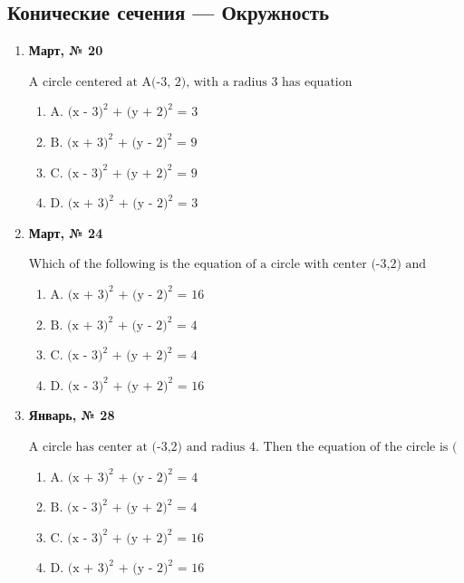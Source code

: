 \subsection*{Конические сечения — Окружность}
\begin{enumerate}
\item \textbf{Март, № 20} \par \smallskip
$\displaystyle \text{A circle centered at A(-3, 2), with a radius 3 has equation}$
\begin{enumerate}
\item $\displaystyle \text{A. (x - 3)}^{2}\text{ + (y + 2)}^{2}\text{ = 3}$
\item $\displaystyle \text{B. (x + 3)}^{2}\text{ + (y - 2)}^{2}\text{ = 9}$
\item $\displaystyle \text{C. (x - 3)}^{2}\text{ + (y + 2)}^{2}\text{ = 9}$
\item $\displaystyle \text{D. (x + 3)}^{2}\text{ + (y - 2)}^{2}\text{ = 3}$
\end{enumerate}
\item \textbf{Март, № 24} \par \smallskip
$\displaystyle \text{Which of the following is the equation of a circle with center (-3,2) and radius 2?}$
\begin{enumerate}
\item $\displaystyle \text{A. (x + 3)}^{2}\text{ + (y - 2)}^{2}\text{ = 16}$
\item $\displaystyle \text{B. (x + 3)}^{2}\text{ + (y - 2)}^{2}\text{ = 4}$
\item $\displaystyle \text{C. (x - 3)}^{2}\text{ + (y + 2)}^{2}\text{ = 4}$
\item $\displaystyle \text{D. (x - 3)}^{2}\text{ + (y + 2)}^{2}\text{ = 16}$
\end{enumerate}
\item \textbf{Январь, № 28} \par \smallskip
$\displaystyle \text{A circle has center at (-3,2) and radius 4. Then the equation of the circle is ( ).}$
\begin{enumerate}
\item $\displaystyle \text{A. (x + 3)}^{2}\text{ + (y - 2)}^{2}\text{ = 4}$
\item $\displaystyle \text{B. (x - 3)}^{2}\text{ + (y + 2)}^{2}\text{ = 4}$
\item $\displaystyle \text{C. (x - 3)}^{2}\text{ + (y + 2)}^{2}\text{ = 16}$
\item $\displaystyle \text{D. (x + 3)}^{2}\text{ + (y - 2)}^{2}\text{ = 16}$

\end{enumerate}
\end{enumerate}
